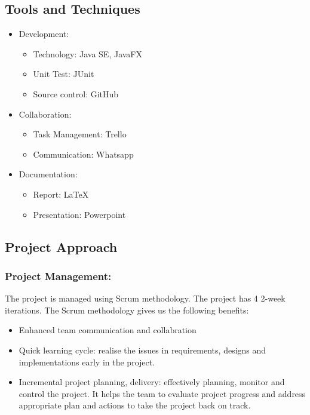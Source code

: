 \documentclass[11pt]{article}
\begin{document}
\subsection{Tools and Techniques}
\begin{itemize}


\item Development:
	\begin{itemize}[noitemsep]
	\item Technology: Java SE, JavaFX
	\item Unit Test: JUnit
	\item Source control: GitHub
	\end{itemize}
\item 	Collaboration:
	\begin{itemize}[noitemsep]
	\item Task Management: Trello
	\item Communication: Whatsapp
	\end{itemize}
\item  	Documentation:
	\begin{itemize}[noitemsep]
	\item Report: LaTeX
	\item Presentation: Powerpoint
	\end{itemize}
\end{itemize}
\subsection{Project Approach} 
    \subsubsection{Project Management: } The project is managed using Scrum methodology. 
    The project has 4  2-week iterations.
    The Scrum methodology gives us the following benefits:
    \begin{itemize}
    
    \item Enhanced team communication and collabration
    \item Quick learning cycle: realise the issues in requirements, designs and implementations early in the project. 
    \item Incremental project planning, delivery: effectively planning, monitor and control the project. It helps the team to evaluate project progress and address appropriate plan and actions to take the project back on track.
    \end{itemize}
    
\end{document}
